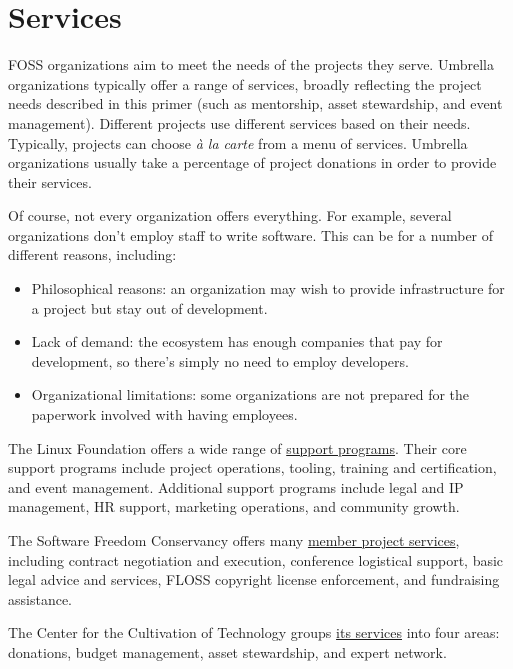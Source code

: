


\chapter{Services}

FOSS organizations aim to meet the needs of the projects they serve.  Umbrella organizations typically offer a range of services, broadly reflecting the project needs described in this primer (such as mentorship, asset stewardship, and event management).  Different projects use different services based on their needs.  Typically, projects can choose \textit{à la carte} from a menu of services.  Umbrella organizations usually take a percentage of project donations in order to provide their services.

Of course, not every organization offers everything.  For example, several organizations don't employ staff to write software.  This can be for a number of different reasons, including:

\begin{itemize}

\item Philosophical reasons: an organization may wish to provide infrastructure for a project but stay out of development.
\item Lack of demand: the ecosystem has enough companies that pay for development, so there's simply no need to employ developers.
\item Organizational limitations: some organizations are not prepared for the paperwork involved with having employees.

\end{itemize}

\begin{kaobox}[frametitle=Example services and support programs]

The Linux Foundation offers a wide range of \href{https://www.linuxfoundation.org/en/projects/support-programs/}{support programs}.  Their core support programs include project operations, tooling, training and certification, and event management.  Additional support programs include legal and IP management, HR support, marketing operations, and community growth.

The Software Freedom Conservancy offers many \href{https://sfconservancy.org/projects/services/}{member project services}, including contract negotiation and execution, conference logistical support, basic legal advice and services, FLOSS copyright license enforcement, and fundraising assistance.

The Center for the Cultivation of Technology groups \href{https://techcultivation.org/#overview}{its services} into four areas: donations, budget management, asset stewardship, and expert network.

\end{kaobox}

